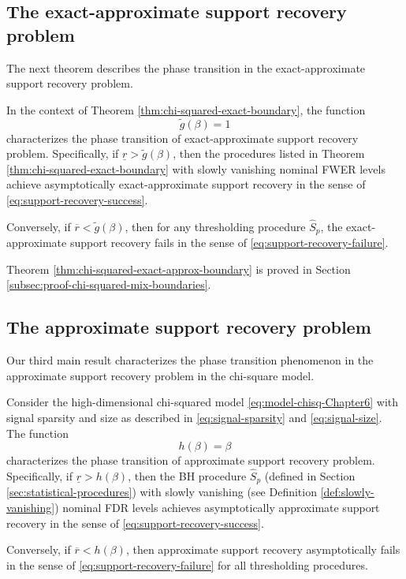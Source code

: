 \subsection{The exact-approximate support recovery problem}
\label{subsec:exact-approx-support-recovery-chisq}

The next theorem describes the phase transition in the exact-approximate support recovery problem.

\begin{theorem} \label{thm:chi-squared-exact-approx-boundary}
In the context of Theorem \ref{thm:chi-squared-exact-boundary}, 
the function 
\begin{equation} \label{eq:exact-approx-boundary-chisquared}
    \widetilde{g}(\beta) = 1
\end{equation}
characterizes the phase transition of exact-approximate support recovery problem.
Specifically, if $\underline{r} > \widetilde{g}(\beta)$, then the procedures listed in Theorem \ref{thm:chi-squared-exact-boundary} with slowly vanishing nominal FWER levels achieve asymptotically exact-approximate support recovery in the sense of \eqref{eq:support-recovery-success}. 

Conversely, if $\overline{r} < \widetilde{g}(\beta)$, then for any thresholding procedure $\widehat{S}_p$, the exact-approximate support recovery fails in the sense of \eqref{eq:support-recovery-failure}.
\end{theorem}

Theorem \ref{thm:chi-squared-exact-approx-boundary} is proved in Section \ref{subsec:proof-chi-squared-mix-boundaries}. 


\subsection{The approximate support recovery problem}
\label{subsec:approx-support-recovery-chisq}

Our third main result characterizes the phase transition phenomenon in the approximate support recovery problem in the chi-square model.

\begin{theorem} \label{thm:chi-squared-approx-boundary}
Consider the high-dimensional chi-squared model \eqref{eq:model-chisq-Chapter6} with signal sparsity and size as described in \eqref{eq:signal-sparsity} and \eqref{eq:signal-size}.
The function 
\begin{equation} \label{eq:approx-boundary-chisquared}
    h(\beta) = \beta
\end{equation}
characterizes the phase transition of approximate support recovery problem.
Specifically, if $\underline{r} > {h}(\beta)$, then the \ac{BH} procedure $\widehat{S}_p$ (defined in Section \ref{sec:statistical-procedures}) with slowly vanishing (see Definition \ref{def:slowly-vanishing}) nominal FDR levels achieves asymptotically approximate support recovery in the sense of \eqref{eq:support-recovery-success}. 

Conversely, if $\overline{r} < {h}(\beta)$, then approximate support recovery asymptotically fails in the sense of \eqref{eq:support-recovery-failure} for all thresholding procedures.
\end{theorem}

